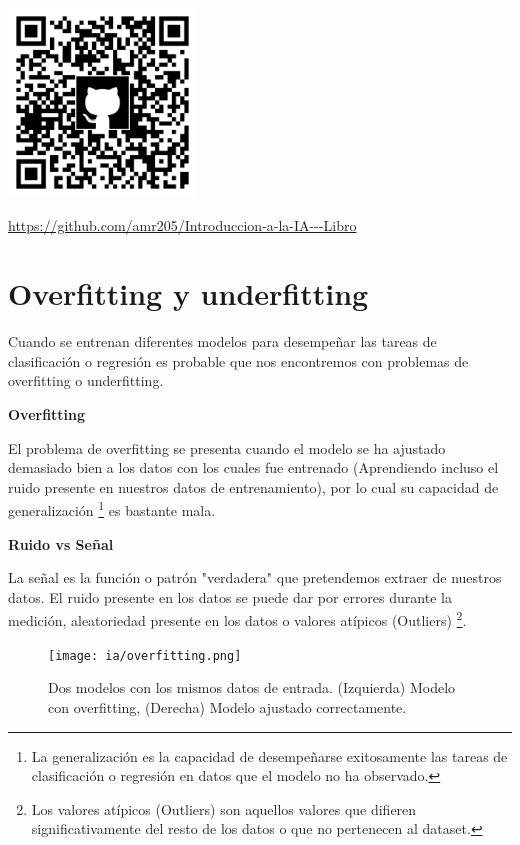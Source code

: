 \documentclass[11pt,fleqn]{book} %
\begin{document}
\includegraphics[width=5cm]{Pictures/github/libro-ia.png}

\url{https://github.com/amr205/Introduccion-a-la-IA---Libro}

\section{Overfitting y underfitting} 

Cuando se entrenan diferentes modelos para desempeñar las tareas de clasificación o regresión es probable que nos encontremos con problemas de overfitting o underfitting.

\textbf{Overfitting}

El problema de overfitting se presenta cuando el modelo se ha ajustado demasiado bien a los datos con los cuales fue entrenado (Aprendiendo incluso el ruido presente en nuestros datos de entrenamiento), por lo cual su capacidad de generalización \footnote{ La generalización es la capacidad de desempeñarse exitosamente las tareas de clasificación o regresión en datos que el modelo no ha observado. } es bastante mala.

\textbf{Ruido vs Señal}

La señal es la función o patrón "verdadera" que pretendemos extraer de nuestros datos. El ruido presente en los datos se puede dar por errores durante la medición, aleatoriedad presente en los datos o valores atípicos (Outliers) \footnote{ Los valores atípicos (Outliers) son aquellos valores que difieren significativamente del resto de los datos o que no pertenecen al dataset. }.


\begin{figure}[ht]
\centering\texttt{[image: ia/overfitting.png]}
\caption{Dos modelos con los mismos datos de entrada. (Izquierda) Modelo con overfitting, (Derecha) Modelo ajustado correctamente.}

\label{fig:overfitting} 
\end{figure}
\end{document}

